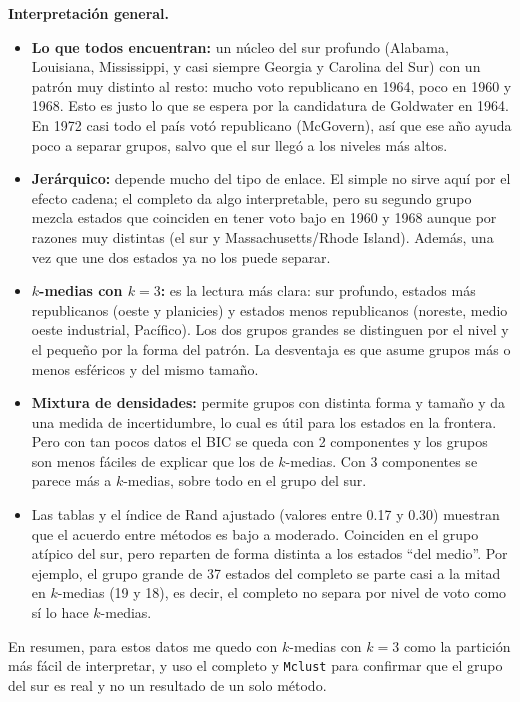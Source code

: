 \documentclass[11pt]{article}\usepackage[]{graphicx}\usepackage[]{xcolor}
\begin{document}
\textbf{Interpretación general.}
\begin{itemize}[leftmargin=*]
\item \textbf{Lo que todos encuentran:} un núcleo del sur profundo (Alabama, Louisiana, Mississippi, y casi siempre Georgia y Carolina del Sur) con un patrón muy distinto al resto: mucho voto republicano en 1964, poco en 1960 y 1968. Esto es justo lo que se espera por la candidatura de Goldwater en 1964. En 1972 casi todo el país votó republicano (McGovern), así que ese año ayuda poco a separar grupos, salvo que el sur llegó a los niveles más altos.
\item \textbf{Jerárquico:} depende mucho del tipo de enlace. El simple no sirve aquí por el efecto cadena; el completo da algo interpretable, pero su segundo grupo mezcla estados que coinciden en tener voto bajo en 1960 y 1968 aunque por razones muy distintas (el sur y Massachusetts/Rhode Island). Además, una vez que une dos estados ya no los puede separar.
\item \textbf{$k$-medias con $k=3$:} es la lectura más clara: sur profundo, estados más republicanos (oeste y planicies) y estados menos republicanos (noreste, medio oeste industrial, Pacífico). Los dos grupos grandes se distinguen por el nivel y el pequeño por la forma del patrón. La desventaja es que asume grupos más o menos esféricos y del mismo tamaño.
\item \textbf{Mixtura de densidades:} permite grupos con distinta forma y tamaño y da una medida de incertidumbre, lo cual es útil para los estados en la frontera. Pero con tan pocos datos el BIC se queda con 2 componentes y los grupos son menos fáciles de explicar que los de $k$-medias. Con 3 componentes se parece más a $k$-medias, sobre todo en el grupo del sur.
\item Las tablas y el índice de Rand ajustado (valores entre 0.17 y 0.30) muestran que el acuerdo entre métodos es bajo a moderado. Coinciden en el grupo atípico del sur, pero reparten de forma distinta a los estados ``del medio''. Por ejemplo, el grupo grande de 37 estados del completo se parte casi a la mitad en $k$-medias (19 y 18), es decir, el completo no separa por nivel de voto como sí lo hace $k$-medias.
\end{itemize}

En resumen, para estos datos me quedo con $k$-medias con $k=3$ como la partición más fácil de interpretar, y uso el completo y \texttt{Mclust} para confirmar que el grupo del sur es real y no un resultado de un solo método.
\end{document}
